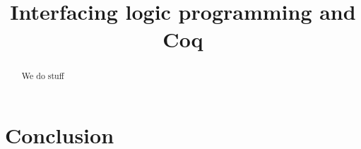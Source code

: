 \documentclass[a4paper,USenglish,cleveref, autoref, thm-restate]{lipics-v2019}
\title{Interfacing logic programming and Coq} %
\begin{document}
\maketitle

\begin{abstract}
We do stuff
\end{abstract}







\section{Conclusion}


\end{document}
